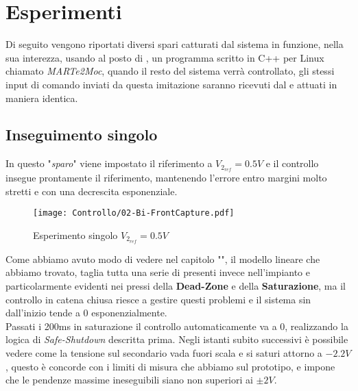 
\section{Esperimenti}
Di seguito vengono riportati diversi spari catturati dal sistema in funzione, nella sua interezza, usando al posto di \MARTe, un programma scritto in C++ per Linux chiamato \textit{MARTe2Moc}, quando il resto del sistema verrà controllato, gli stessi input di comando inviati da questa imitazione saranno ricevuti dal \microControllore e attuati in maniera identica.

\subsection{Inseguimento singolo}
In questo "\textit{sparo}" viene impostato il riferimento a $ V_{2_{ref}}=0.5V $ e il controllo insegue prontamente il riferimento, mantenendo l'errore entro margini molto stretti e con una decrescita esponenziale.\vspace{-2mm}
\begin{figure}[H]
	\centering
	\caption[Esperimento singolo $ V_{2_{ref}}=0.5V $]{Esperimento singolo $ V_{2_{ref}}=0.5V $}
	\texttt{[image: Controllo/02-Bi-FrontCapture.pdf]}
\end{figure}\vspace{-8mm}
\noindent
Come abbiamo avuto modo di vedere nel capitolo "", il modello lineare che abbiamo trovato, taglia tutta una serie di \nonLinearita presenti invece nell'impianto e particolarmente evidenti nei pressi della \textbf{Dead-Zone} e della \textbf{Saturazione}, ma il controllo in catena chiusa riesce a gestire questi problemi e il sistema sin dall'inizio tende a 0 esponenzialmente.\\
Passati i 200ms in saturazione il controllo automaticamente va a 0, realizzando la logica di \textit{Safe-Shutdown} descritta prima. Negli istanti subito successivi è possibile vedere come la tensione sul secondario vada fuori scala e si saturi attorno a $ -2.2V $, questo è concorde con i limiti di misura che abbiamo sul prototipo, e impone che le pendenze massime ineseguibili siano non superiori ai $ \pm2V $.

